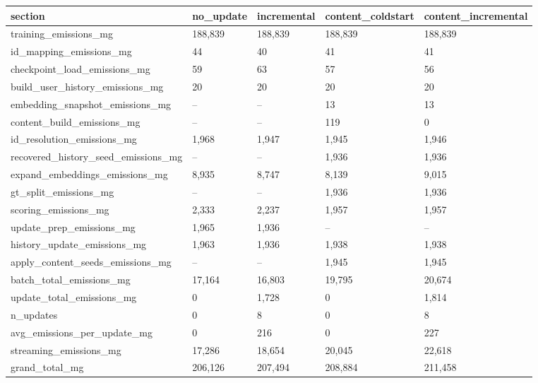 \begin{tabular}{lllll}
\toprule
section & no_update & incremental & content_coldstart & content_incremental \\
\midrule
training_emissions_mg & 188,839 & 188,839 & 188,839 & 188,839 \\
id_mapping_emissions_mg & 44 & 40 & 41 & 41 \\
checkpoint_load_emissions_mg & 59 & 63 & 57 & 56 \\
build_user_history_emissions_mg & 20 & 20 & 20 & 20 \\
embedding_snapshot_emissions_mg & -- & -- & 13 & 13 \\
content_build_emissions_mg & -- & -- & 119 & 0 \\
id_resolution_emissions_mg & 1,968 & 1,947 & 1,945 & 1,946 \\
recovered_history_seed_emissions_mg & -- & -- & 1,936 & 1,936 \\
expand_embeddings_emissions_mg & 8,935 & 8,747 & 8,139 & 9,015 \\
gt_split_emissions_mg & -- & -- & 1,936 & 1,936 \\
scoring_emissions_mg & 2,333 & 2,237 & 1,957 & 1,957 \\
update_prep_emissions_mg & 1,965 & 1,936 & -- & -- \\
history_update_emissions_mg & 1,963 & 1,936 & 1,938 & 1,938 \\
apply_content_seeds_emissions_mg & -- & -- & 1,945 & 1,945 \\
batch_total_emissions_mg & 17,164 & 16,803 & 19,795 & 20,674 \\
update_total_emissions_mg & 0 & 1,728 & 0 & 1,814 \\
n_updates & 0 & 8 & 0 & 8 \\
avg_emissions_per_update_mg & 0 & 216 & 0 & 227 \\
streaming_emissions_mg & 17,286 & 18,654 & 20,045 & 22,618 \\
grand_total_mg & 206,126 & 207,494 & 208,884 & 211,458 \\
\bottomrule
\end{tabular}
